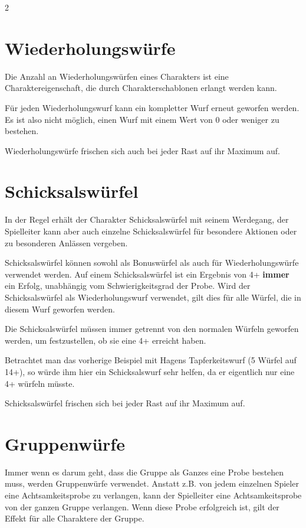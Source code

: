 \begin{multicols}{2}
\section{Wiederholungswürfe}

Die Anzahl an Wiederholungswürfen eines Charakters ist eine Charaktereigenschaft, die durch Charakterschablonen erlangt werden kann.

Für jeden Wiederholungswurf kann ein kompletter Wurf erneut geworfen werden. Es ist also nicht möglich, einen Wurf mit einem Wert von 0 oder weniger zu bestehen.

Wiederholungswürfe frischen sich auch bei jeder Rast auf ihr Maximum auf.

\section{Schicksalswürfel}

In der Regel erhält der Charakter Schicksalswürfel mit seinem Werdegang, der Spielleiter kann aber auch einzelne Schicksalswürfel für besondere Aktionen oder zu besonderen Anlässen vergeben.

Schicksalswürfel können sowohl als Bonuswürfel als auch für Wiederholungswürfe verwendet werden. Auf einem Schicksalswürfel ist ein Ergebnis von 4+ \textbf{immer} ein Erfolg, unabhängig vom Schwierigkeitsgrad der Probe. Wird der Schicksalswürfel als Wiederholungswurf verwendet, gilt dies für alle Würfel, die in diesem Wurf geworfen werden.

Die Schicksalswürfel müssen immer getrennt von den normalen Würfeln geworfen werden, um festzustellen, ob sie eine 4+ erreicht haben.

\begin{pexample}[Beispiel]
Betrachtet man das vorherige Beispiel mit Hagens Tapferkeitswurf (5 Würfel auf 14+), so würde ihm hier ein Schicksalswurf sehr helfen, da er eigentlich nur eine 4+ würfeln müsste.
\end{pexample}

Schicksalswürfel frischen sich bei jeder Rast auf ihr Maximum auf.

\section{Gruppenwürfe}

Immer wenn es darum geht, dass die Gruppe als Ganzes eine Probe bestehen muss, werden Gruppenwürfe verwendet. Anstatt z.B. von jedem einzelnen Spieler eine Achtsamkeitsprobe zu verlangen, kann der Spielleiter eine Achtsamkeitsprobe von der ganzen Gruppe verlangen. Wenn diese Probe erfolgreich ist, gilt der Effekt für alle Charaktere der Gruppe.


\end{multicols}
